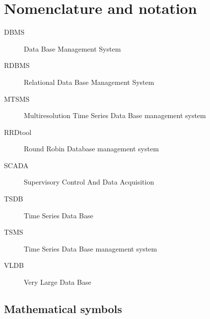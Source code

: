 \section{Nomenclature and notation}

\begin{description}
\item[DBMS] Data Base Management System
\item[RDBMS] Relational Data Base Management System
\item[MTSMS] Multiresolution Time Series Data Base management system
\item[RRDtool] Round Robin Database management system \parencite{rrdtool}
\item[SCADA] Supervisory Control And Data Acquisition
\item[TSDB] Time Series Data Base
\item[TSMS] Time Series Data Base management system
\item[VLDB] Very Large Data Base 
\end{description}

\subsection{Mathematical symbols}



